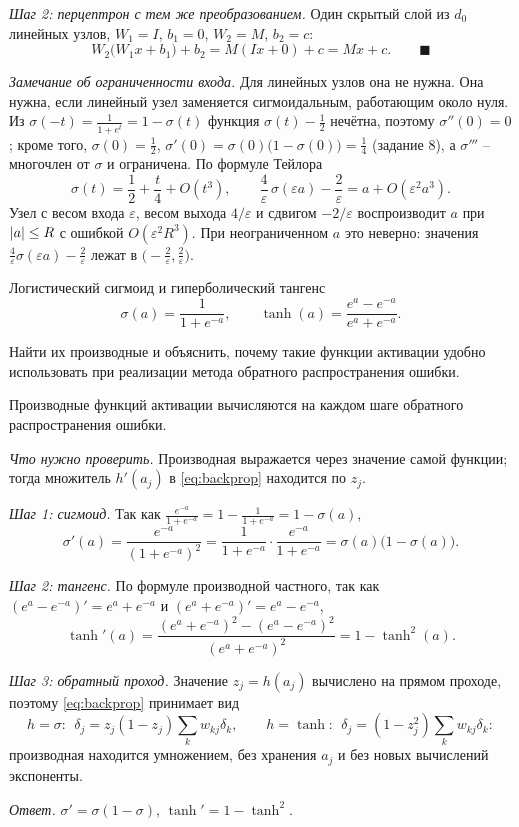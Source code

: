 \documentclass[12pt,a4paper]{article}
\begin{document}
\emph{Шаг 2: перцептрон с тем же преобразованием.} Один скрытый слой из $d_0$
линейных узлов, $W_1 = I$, $b_1 = 0$, $W_2 = M$, $b_2 = c$:
\[
  W_2\bigl(W_1x + b_1\bigr) + b_2 = M(Ix + 0) + c = Mx + c .
  \qquad \blacksquare
\]

\emph{Замечание об ограниченности входа.} Для линейных узлов она не нужна. Она
нужна, если линейный узел заменяется сигмоидальным, работающим около нуля.
Из $\sigma(-t) = \frac{1}{1 + e^{t}} = 1 - \sigma(t)$ функция
$\sigma(t) - \frac12$ нечётна, поэтому $\sigma''(0) = 0$; кроме того,
$\sigma(0) = \frac12$, $\sigma'(0) = \sigma(0)\bigl(1 - \sigma(0)\bigr) = \frac14$
(задание 8), а $\sigma'''$ -- многочлен от $\sigma$ и ограничена. По формуле
Тейлора
\[
  \sigma(t) = \frac12 + \frac t4 + O(t^3),
  \qquad
  \frac{4}{\varepsilon}\,\sigma(\varepsilon a) - \frac{2}{\varepsilon}
  = a + O(\varepsilon^2a^3) .
\]
Узел с весом входа $\varepsilon$, весом выхода $4/\varepsilon$ и сдвигом
$-2/\varepsilon$ воспроизводит $a$ при $\left\lvert a \right\rvert \le R$ с ошибкой
$O(\varepsilon^2R^3)$. При неограниченном $a$ это неверно: значения
$\frac{4}{\varepsilon}\sigma(\varepsilon a) - \frac{2}{\varepsilon}$ лежат в
$\bigl(-\frac{2}{\varepsilon}, \frac{2}{\varepsilon}\bigr)$.

\dano Логистический сигмоид и гиперболический тангенс
\[
  \sigma(a) = \frac{1}{1 + e^{-a}},
  \qquad
  \tanh(a) = \frac{e^a - e^{-a}}{e^a + e^{-a}} .
\]

\treb Найти их производные и объяснить, почему такие функции активации удобно
использовать при реализации метода обратного распространения ошибки.

\zachem Производные функций активации вычисляются на каждом шаге обратного
распространения ошибки.

\resh \emph{Что нужно проверить.} Производная выражается через значение самой
функции; тогда множитель $h'(a_j)$ в \eqref{eq:backprop} находится по $z_j$.

\emph{Шаг 1: сигмоид.} Так как
$\frac{e^{-a}}{1 + e^{-a}} = 1 - \frac{1}{1 + e^{-a}} = 1 - \sigma(a)$,
\[
  \sigma'(a) = \frac{e^{-a}}{(1 + e^{-a})^2}
             = \frac{1}{1 + e^{-a}}\cdot\frac{e^{-a}}{1 + e^{-a}}
             = \sigma(a)\bigl(1 - \sigma(a)\bigr) .
\]

\emph{Шаг 2: тангенс.} По формуле производной частного, так как
$(e^a - e^{-a})' = e^a + e^{-a}$ и $(e^a + e^{-a})' = e^a - e^{-a}$,
\[
  \tanh'(a) = \frac{(e^a + e^{-a})^2 - (e^a - e^{-a})^2}{(e^a + e^{-a})^2}
            = 1 - \tanh^2(a) .
\]

\emph{Шаг 3: обратный проход.} Значение $z_j = h(a_j)$ вычислено на прямом
проходе, поэтому \eqref{eq:backprop} принимает вид
\[
  h = \sigma:\ \ \delta_j = z_j(1 - z_j)\sum_k w_{kj}\delta_k,
  \qquad
  h = \tanh:\ \ \delta_j = (1 - z_j^2)\sum_k w_{kj}\delta_k :
\]
производная находится умножением, без хранения $a_j$ и без новых вычислений
экспоненты.

\emph{Ответ.} $\sigma' = \sigma(1 - \sigma)$, $\tanh' = 1 - \tanh^2$.
\end{document}

